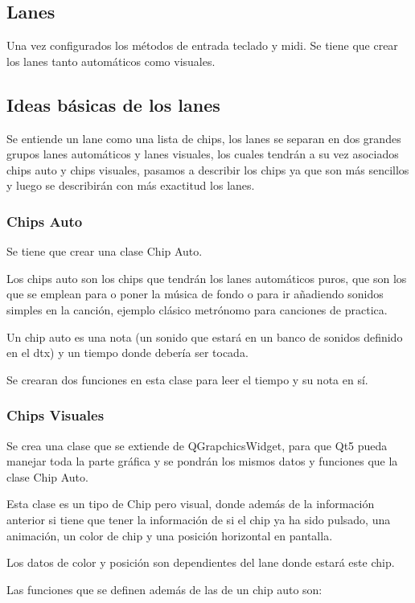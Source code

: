 \documentclass[a4paper,11pt,oneside]{book}
\begin{document}
\subsection{Lanes}
 Una vez configurados los métodos de entrada teclado y midi. Se tiene que crear los lanes tanto automáticos como visuales.

\subsection{Ideas básicas de los lanes}
Se entiende un lane como una lista de chips, los lanes se separan en dos grandes grupos lanes automáticos y lanes visuales, los cuales tendrán a su vez asociados chips auto y chips visuales, pasamos a describir los chips ya que son más sencillos y luego se describirán con más exactitud los lanes.

\subsubsection{Chips Auto}
Se tiene que crear una clase Chip Auto.

Los chips auto son los chips que tendrán los lanes automáticos puros, que son los que se emplean para o poner la música de fondo o para ir añadiendo sonidos simples en la canción, ejemplo clásico metrónomo para canciones de practica.

Un chip auto es una nota (un sonido que estará en un banco de sonidos definido en el dtx) y un tiempo donde debería ser tocada.

Se crearan dos funciones en esta clase para leer el tiempo y su nota en sí.

\subsubsection{Chips Visuales}
Se crea una clase que se extiende de QGrapchicsWidget, para que Qt5 pueda manejar toda la parte gráfica y se pondrán los mismos datos y funciones que la clase Chip Auto.

Esta clase es un tipo de Chip pero visual, donde además de la información anterior si tiene que tener la información de si el chip ya ha sido pulsado, una animación, un color de chip y una posición horizontal en pantalla.

Los datos de color y posición son dependientes del lane donde estará este chip.

Las funciones que se definen además de las de un chip auto son:
\end{document}
